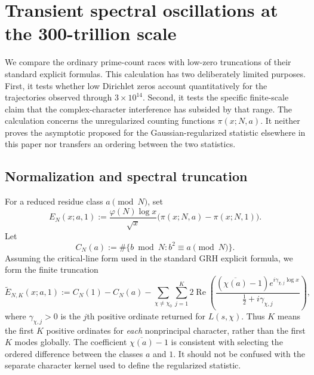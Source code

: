 
\section{Transient spectral oscillations at the 300-trillion scale}
\label{sec:spectral-transients}

We compare the ordinary prime-count races with low-zero truncations of their
standard explicit formulas.  This calculation has two deliberately limited
purposes.  First, it tests whether low Dirichlet zeros account quantitatively
for the trajectories observed through $3\times 10^{14}$.  Second, it tests the
specific finite-scale claim that the complex-character interference has
subsided by that range.  The calculation concerns the unregularized counting
functions $\pi(x;N,a)$.  It neither proves the asymptotic proposed for the
Gaussian-regularized statistic elsewhere in this paper nor transfers an
ordering between the two statistics.

\subsection{Normalization and spectral truncation}

For a reduced residue class $a\pmod N$, set
\begin{equation}
  E_N(x;a,1)
  :=\frac{\varphi(N)\log x}{\sqrt{x}}
    \bigl(\pi(x;N,a)-\pi(x;N,1)\bigr).
  \label{eq:ordinary-race-normalization}
\end{equation}
Let
\[
  C_N(a):=\#\{b\bmod N:b^2\equiv a\pmod N\}.
\]
Assuming the critical-line form used in the standard GRH explicit formula,
we form the finite truncation
\begin{equation}
  \widetilde E_{N,K}(x;a,1)
  :=C_N(1)-C_N(a)
   -\sum_{\chi\ne\chi_0}\sum_{j=1}^{K}
     2\operatorname{Re}\!\left(
       \frac{(\overline{\chi(a)}-1)e^{i\gamma_{\chi,j}\log x}}
            {\tfrac12+i\gamma_{\chi,j}}
     \right),
  \label{eq:ordinary-race-truncation}
\end{equation}
where $\gamma_{\chi,j}>0$ is the $j$th positive ordinate returned for
$L(s,\chi)$.  Thus $K$ means the first $K$ positive ordinates for
\emph{each} nonprincipal character, rather than the first $K$ modes globally.
The coefficient $\overline{\chi(a)}-1$ is consistent with selecting the
ordered difference between the classes $a$ and $1$.  It should not be
confused with the separate character kernel used to define the regularized
statistic.

